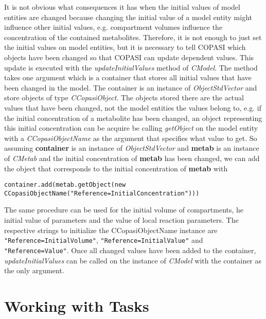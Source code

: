 \documentclass[a4,10pt]{article}
\begin{document}
It is not obvious what consequences it has when the initial values of model entities are changed because changing the initial value of a model entity might influence other initial values, e.g. compartment volumes influence the concentration of the contained metabolites.
Therefore, it is not enough to just set the initial values on model entities, but it is necessary to tell COPASI which objects have been changed so that COPASI can update dependent values.
This update is executed with the \textit{updateInitialValues} method of \textit{CModel}. The method takes one argument which is a container that stores all initial values that have been changed in the model. The container is an instance of \textit{ObjectStdVector} and store objects of type \textit{CCopasiObject}. The objects stored there are the actual values that have been changed, not the model entities the values belong to, e.g. if the initial concentration of a metabolite has been changed, an object representing this initial concentration can be acquire be calling \textit{getObject} on the model entity with a \textit{CCopasiObjectName} as the argument that specifies what value to get.
So assuming \textbf{container} is an instance of \textit{ObjectStdVector} and \textbf{metab} is an instance of \textit{CMetab} and the initial concentration of \textbf{metab} has been changed, we can add the object that corresponds to the initial concentration of \textbf{metab} with
\small{
\begin{verbatim}
container.add(metab.getObject(new CCopasiObjectName("Reference=InitialConcentration")))
\end{verbatim}
}
The same procedure can be used for the initial volume of compartments, he initial value of parameters and the value of local reaction parameters. The respective strings to initialize the CCopasiObjectName instance are \verb$"Reference=InitialVolume"$, \verb$"Reference=InitialValue"$ and \verb$"Reference=Value"$.
Once all changed values have been added to the container, \textit{updateInitialValues} can be called on the instance of \textit{CModel} with the container as the only argument. 



\section{Working with Tasks}
\end{document}
